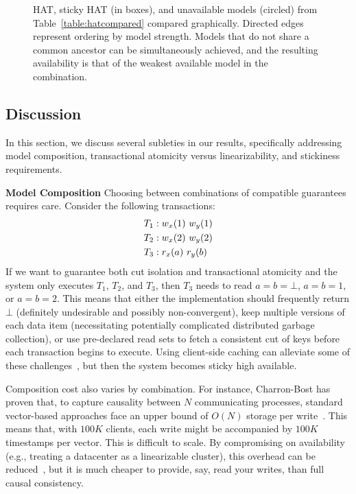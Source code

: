 \begin{figure}[t!]
\label{fig:hat-order}
\caption{HAT, sticky HAT (in boxes), and unavailable models (circled)
  from Table~\protect\ref{table:hatcompared} compared
  graphically. Directed edges represent ordering by model
  strength. Models that do not share a common ancestor can be
  simultaneously achieved, and the resulting availability is that of
  the weakest available model in the combination.}
\label{fig:hatcompared}
\end{figure}


\subsection{Discussion}
\label{sec:discussion}

In this section, we discuss several subleties in our results,
specifically addressing model composition, transactional atomicity
versus linearizability, and stickiness requirements.

\vspace{.5em}\noindent\textbf{Model Composition} Choosing between
combinations of compatible guarantees requires care. Consider the
following transactions:
\begin{align*}
\small
T_1 &: w_x(1)~w_y(1)
\\T_2 &: w_x(2)~w_y(2)
\\T_3 &: r_x(a)~r_y(b)
\end{align*}
If we want to guarantee both cut isolation and transactional atomicity
and the system only executes $T_1$, $T_2$, and $T_3$, then $T_3$ needs
to read $a=b=\bot$, $a=b=1$, or $a=b=2$. This means that either the
implementation should frequently return $\bot$ (definitely undesirable
and possibly non-convergent), keep multiple versions of each data item
(necessitating potentially complicated distributed garbage
collection), or use pre-declared read sets to fetch a consistent cut
of keys before each transaction begins to execute. Using client-side
caching can alleviate some of these challenges~\cite{bolton, swift},
but then the system becomes sticky high available.

Composition cost also varies by combination. For instance, Charron-Bost
has proven that, to capture causality between $N$ communicating
processes, standard vector-based approaches face an upper bound of
$O(N)$ storage per write~\cite{charron-bost}. This means that, with
$100K$ clients, each write might be accompanied by $100K$ timestamps
per vector. This is difficult to scale. By compromising on
availability (e.g., treating a datacenter as a linearizable cluster),
this overhead can be reduced~\cite{cops, eiger}, but it is much
cheaper to provide, say, read your writes, than full causal
consistency.

